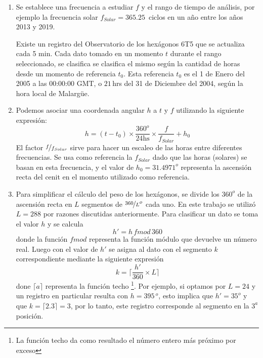       \begin{enumerate}
        \item Se establece una frecuencia a estudiar $f$ y el rango de tiempo de análisis, por ejemplo la frecuencia solar $f_{Solar}= 365.25\,$ ciclos en un año entre los años 2013 y 2019. 

        Existe un registro del Observatorio de los hexágonos 6T5 que se actualiza cada 5 min. Cada dato tomado en un momento $t$ durante el rango seleccionado, se clasifica se clasifica el mismo según la cantidad de horas desde un momento de referencia $t_0$. Esta referencia $t_0$ es el 1 de Enero del 2005 a las 00:00:00 GMT, o  $21\,$hrs del 31 de Diciembre del 2004, según la hora local de Malargüe.

        \item Podemos asociar una coordenada angular $h$ a $t$  y $f$  utilizando la siguiente expresión:
         \begin{equation}
          h = (t-t_0) \times \frac{360^o}{24\text{hs}} \times\frac{f}{f_{Solar}} + h_0
          \label{eq:h_horas} 
        \end{equation}
        El factor $\nicefrac{f}{f_{Solar}}$ sirve para hacer un escaleo de las horas entre diferentes frecuencias. Se usa como referencia la $f_{Solar}$ dado que las horas (solares) se basan en esta frecuencia, y el valor de $h_0=31.4971^o$ representa la ascensión recta del cenit en el momento utilizado como referencia.
        
        \item  Para simplificar el cálculo del peso de los hexágonos, se divide los $360^o$ de la ascensión recta en $L$ segmentos de $\nicefrac{360}{L} ^o$ cada uno. En este trabajo se utilizó $L=288$ por razones discutidas anteriormente. Para clasificar un dato se  toma  el valor $h$  y se calcula
        \begin{equation}
          h' = h\, fmod \,360 
          \label{eq:h_primado}
        \end{equation}
        donde la función $fmod$ representa la función módulo que devuelve un número real. Luego con el valor de $h'$ se asigna al dato con el segmento $k$ correspondiente mediante la siguiente expresión
        \begin{equation}
          k = \bigg \lceil \frac{h'}{360}\times L \bigg \rceil
        \end{equation}
        done $\lceil a \rceil$ representa la función techo \footnote{La función techo da como resultado el número entero más próximo por exceso}. Por ejemplo, si optamos por $L=24$ y un registro en particular resulta con  $h=395\,^o$, esto implica que $h'= 35^o$ y que $k=\lceil 2.3 \rceil=3$, por lo tanto, este registro corresponde al segmento en la $3^{a}$ posición.


\end{enumerate}
